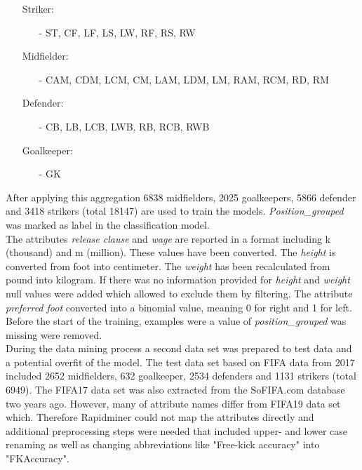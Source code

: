 \documentclass[runningheads]{llncs}
\begin{document}
\begin{itemize} 
\item[] Striker:
\begin{itemize}
\item[-] ST, CF, LF, LS, LW, RF, RS, RW
\end{itemize}
\item[] Midfielder:
\begin{itemize}
\item[-] CAM, CDM, LCM, CM, LAM, LDM, LM, RAM, RCM, RD, RM
\end{itemize}
\item[] Defender:
\begin{itemize} 
\item[-] CB, LB, LCB, LWB, RB, RCB, RWB
\end{itemize}
\item[] Goalkeeper:
\begin{itemize}
\item[-] GK
\end{itemize}
\end{itemize}
After applying this aggregation 6838 midfielders, 2025 goalkeepers, 5866 defender and 3418 strikers (total 18147) are used to train the models. \textit{Position\_grouped }was marked as label in the classification model.\\
The attributes\textit{ release clause} and \textit{wage} are reported in a format including k (thousand) and m (million). These values have been converted. The \textit{height} is converted from foot into centimeter. The \textit{weight} has been recalculated from pound into kilogram. If there was no information provided for \textit{height} and \textit{weight} null values were added which allowed to exclude them by filtering. The attribute \textit{preferred foot }converted into a binomial value, meaning 0 for right and 1 for left. %
Before the start of the training, examples were a value of \textit{position\_grouped} was missing were removed.\\
During the data mining process a second data set was prepared to test data and a potential overfit of the model. The test data set based on FIFA data from 2017 included 2652 midfielders, 632 goalkeeper, 2534 defenders and 1131 strikers (total 6949).
The FIFA17 data set was also extracted from the SoFIFA.com database two years ago. However, many of attribute names differ from FIFA19 data set which. Therefore  Rapidminer could not map the attributes directly and additional preprocessing steps were needed that included upper- and lower case renaming as well as changing abbreviations like "Free-kick accuracy" into "FKAccuracy".
\end{document}
